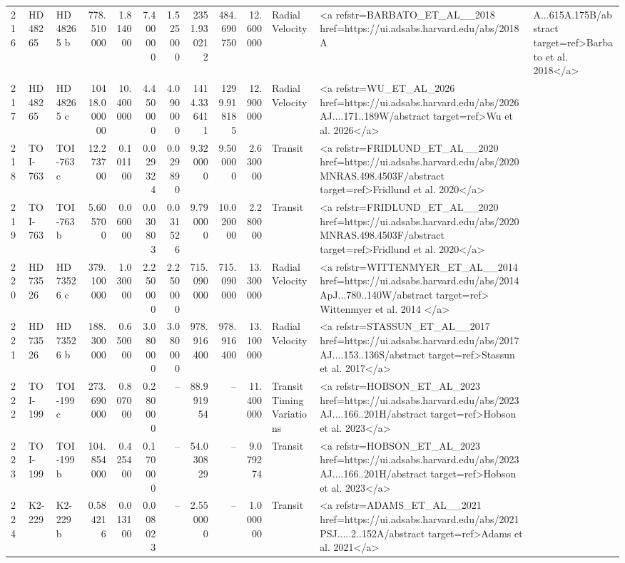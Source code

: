 \begin{tabular}{lllrrrrrrrll}
216 & HD 48265 & HD 48265 b & 778.510000 & 1.814000 & 7.400000 & 1.525000 & 2351.930212 & 484.690750 & 12.600000 & Radial Velocity & <a refstr=BARBATO_ET_AL__2018 href=https://ui.adsabs.harvard.edu/abs/2018A&A...615A.175B/abstract target=ref>Barbato et al. 2018</a> \\
217 & HD 48265 & HD 48265 c & 10418.000000 & 10.400000 & 4.450000 & 4.090000 & 1414.336411 & 1299.918185 & 12.900000 & Radial Velocity & <a refstr=WU_ET_AL_2026 href=https://ui.adsabs.harvard.edu/abs/2026AJ....171..189W/abstract target=ref>Wu et al. 2026</a> \\
218 & TOI-763 & TOI-763 c & 12.273700 & 0.101100 & 0.029324 & 0.029890 & 9.320000 & 9.500000 & 2.630000 & Transit & <a refstr=FRIDLUND_ET_AL__2020 href=https://ui.adsabs.harvard.edu/abs/2020MNRAS.498.4503F/abstract target=ref>Fridlund et al. 2020</a> \\
219 & TOI-763 & TOI-763 b & 5.605700 & 0.060000 & 0.030803 & 0.031526 & 9.790000 & 10.020000 & 2.280000 & Transit & <a refstr=FRIDLUND_ET_AL__2020 href=https://ui.adsabs.harvard.edu/abs/2020MNRAS.498.4503F/abstract target=ref>Fridlund et al. 2020</a> \\
220 & HD 73526 & HD 73526 c & 379.100000 & 1.030000 & 2.250000 & 2.250000 & 715.090000 & 715.090000 & 13.300000 & Radial Velocity & <a refstr=WITTENMYER_ET_AL__2014 href=https://ui.adsabs.harvard.edu/abs/2014ApJ...780..140W/abstract target=ref>  Wittenmyer et al. 2014 </a> \\
221 & HD 73526 & HD 73526 b & 188.300000 & 0.650000 & 3.080000 & 3.080000 & 978.916400 & 978.916400 & 13.100000 & Radial Velocity & <a refstr=STASSUN_ET_AL__2017 href=https://ui.adsabs.harvard.edu/abs/2017AJ....153..136S/abstract target=ref>Stassun et al. 2017</a> \\
222 & TOI-199 & TOI-199 c & 273.690000 & 0.807000 & 0.280000 & -- & 88.991954 & -- & 11.400000 & Transit Timing Variations & <a refstr=HOBSON_ET_AL_2023 href=https://ui.adsabs.harvard.edu/abs/2023AJ....166..201H/abstract target=ref>Hobson et al. 2023</a> \\
223 & TOI-199 & TOI-199 b & 104.854000 & 0.425400 & 0.170000 & -- & 54.030829 & -- & 9.079274 & Transit & <a refstr=HOBSON_ET_AL_2023 href=https://ui.adsabs.harvard.edu/abs/2023AJ....166..201H/abstract target=ref>Hobson et al. 2023</a> \\
224 & K2-229 & K2-229 b & 0.584216 & 0.013100 & 0.008023 & -- & 2.550000 & -- & 1.000000 & Transit & <a refstr=ADAMS_ET_AL__2021 href=https://ui.adsabs.harvard.edu/abs/2021PSJ.....2..152A/abstract target=ref>Adams et al. 2021</a> \\

\end{tabular}
